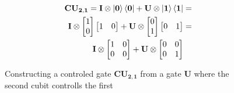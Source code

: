 \begin{figure}[H]
    \begin{align*}
        \mathbf{CU_{2,1}}=\mathbf{I}\otimes\ket{\mathbf{0}}\bra{\mathbf{0}} + \mathbf{U}\otimes\ket{\mathbf{1}}\bra{\mathbf{1}}&=\\
        \mathbf{I}\otimes
        \begin{bmatrix}
            1 \\
            0 \\
        \end{bmatrix}
        \begin{bmatrix}
            1 & 0 \\
        \end{bmatrix}+
        \mathbf{U}\otimes
        \begin{bmatrix}
            0 \\
            1 \\
        \end{bmatrix}
        \begin{bmatrix}
            0 & 1 \\
        \end{bmatrix}
        &=\\
        \mathbf{I}\otimes
        \begin{bmatrix}
            1 & 0 \\
            0 & 0 \\
        \end{bmatrix}+ 
        \mathbf{U}\otimes
        \begin{bmatrix}
            0 & 0 \\
            0 & 1 \\
        \end{bmatrix}& 
    \end{align*}
    \caption{Constructing a controled gate $\mathbf{CU_{2,1}}$ from a gate $\mathbf{U}$ where the second cubit controlls the first}
    \label{fig:CU1}
\end{figure}

